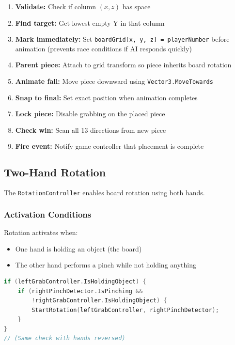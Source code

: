 \documentclass[11pt]{article}
\begin{document}
\begin{enumerate}
    \item \textbf{Validate:} Check if column $(x, z)$ has space
    \item \textbf{Find target:} Get lowest empty Y in that column
    \item \textbf{Mark immediately:} Set \texttt{boardGrid[x, y, z] = playerNumber} before animation (prevents race conditions if AI responds quickly)
    \item \textbf{Parent piece:} Attach to grid transform so piece inherits board rotation
    \item \textbf{Animate fall:} Move piece downward using \texttt{Vector3.MoveTowards}
    \item \textbf{Snap to final:} Set exact position when animation completes
    \item \textbf{Lock piece:} Disable grabbing on the placed piece
    \item \textbf{Check win:} Scan all 13 directions from new piece
    \item \textbf{Fire event:} Notify game controller that placement is complete
\end{enumerate}


\subsection{Two-Hand Rotation}

The \texttt{RotationController} enables board rotation using both hands.

\subsubsection{Activation Conditions}

Rotation activates when:
\begin{itemize}
    \item One hand is holding an object (the board)
    \item The other hand performs a pinch while not holding anything
\end{itemize}

\begin{lstlisting}[language=C, caption=Rotation Trigger Logic]
if (leftGrabController.IsHoldingObject) {
    if (rightPinchDetector.IsPinching &&
        !rightGrabController.IsHoldingObject) {
        StartRotation(leftGrabController, rightPinchDetector);
    }
}
// (Same check with hands reversed)
\end{lstlisting}
\end{document}
